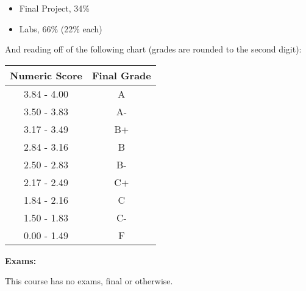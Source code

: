 \documentclass[12pt]{article}
\begin{document}
\begin{itemize}\setlength\itemsep{0em}
\item Final Project, 34\%
\item Labs, 66\% (22\% each)
\end{itemize}

And reading off of the following chart (grades are rounded to the
second digit):

\begin{center}
\begin{tabular}{c || c}
Numeric Score & Final Grade \\
\hline \hline
3.84 - 4.00 & A  \\
3.50 - 3.83 & A- \\
3.17 - 3.49 & B+ \\
2.84 - 3.16 & B  \\
2.50 - 2.83 & B- \\
2.17 - 2.49 & C+ \\
1.84 - 2.16 & C  \\
1.50 - 1.83 & C- \\
0.00 - 1.49 & F
\end{tabular}
\end{center}

\vspace{0.4cm}

\textbf{Exams:} \vspace{6pt}

This course has no exams, final or otherwise.






\end{document}
